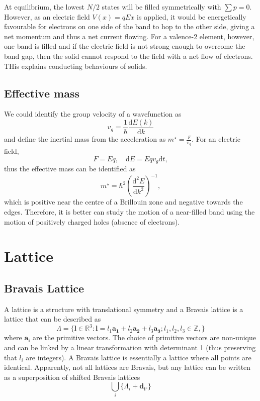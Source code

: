 \documentclass{article}
\theoremstyle{nonumberplain}
\begin{document}
At equilibrium, the lowest $N /2$ states will be filled symmetrically with $\sum p = 0.$ However, as an electric field $V(x) = q E x$ is applied, it would be energetically favourable for electrons on one side of the band to hop to the other side, giving a net momentum and thus a net current flowing. For a valence-2 element, however, one band is filled and if the electric field is not strong enough to overcome the band gap, then the solid cannot respond to the field with a net flow of electrons. THis explains conducting behaviours of solids. 

\subsection{Effective mass}
We could identify the group velocity of a wavefunction as
\[
    v_g = \frac{1}{\hbar } \frac{\mathrm{d}E(k)}{\mathrm{d}k} 
\]
and define the inertial mass from the acceleration as
\(
    m^{\star} = \frac{F}{\dot{v_g}}. 
\)
For an electric field, 
\[
    F = E q, \quad \mathrm{d} E = E q v_g \mathrm{d} t,
\]
thus the effective mass can be identified as
\[
    m^{\star } = \hbar ^{2} \left(\frac{\mathrm{d}^{2} E}{\mathrm{d}k^{2} } \right)^{-1},
\]
which is positive near the centre of a Brillouin zone and negative towards the edges. Therefore, it is better can study the motion of a near-filled band using the motion of positively charged holes (absence of electrons). 
\section{Lattice}
\subsection{Bravais Lattice}
A lattice is a structure with translational symmetry and a Bravais lattice is a lattice that can be described as
\[
    \Lambda = \{ \mathbf{l} \in \mathbb{R}^3: \mathbf{l} = l_1 \mathbf{a_1} + l_2 \mathbf{a_2}+ l_3 \mathbf{a_3}; l_1, l_2, l_3 \in \mathbb{Z},  \}
\]
where $\mathbf{a_i} $ are the primitive vectors. The choice of primitive vectors are non-unique and can be linked by a linear transformation with determinant 1 (thus preserving that $l_i$ are integers). A Bravais lattice is essentially a lattice where all points are identical. Apparently, not all lattices are Bravais, but any lattice can be written as a superposition of shifted Bravais lattices 
\[
    \bigcup_i \{ \Lambda_i + \mathbf{d_i}. \}
\]
\end{document}
